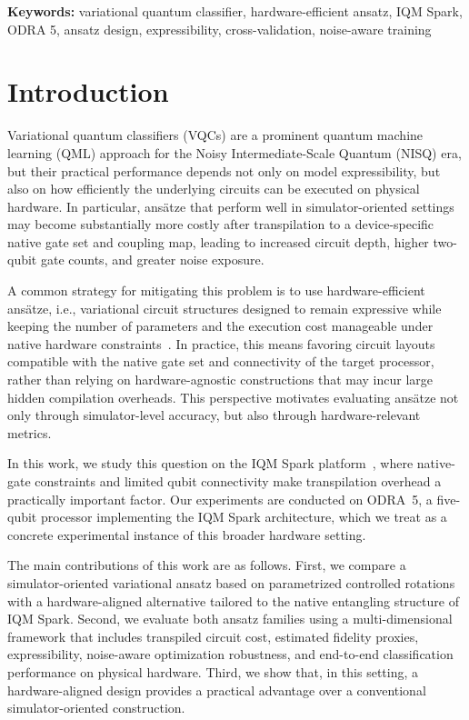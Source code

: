 \documentclass[11pt]{article}
\begin{document}
\noindent\textbf{Keywords:} variational quantum classifier, hardware-efficient ansatz, IQM Spark, ODRA 5, ansatz design, expressibility, cross-validation, noise-aware training

\section{Introduction}

Variational quantum classifiers (VQCs) are a prominent quantum machine learning (QML) approach for the Noisy Intermediate-Scale Quantum (NISQ) era, but their practical performance depends not only on model expressibility, but also on how efficiently the underlying circuits can be executed on physical hardware. In particular, ansätze that perform well in simulator-oriented settings may become substantially more costly after transpilation to a device-specific native gate set and coupling map, leading to increased circuit depth, higher two-qubit gate counts, and greater noise exposure.

A common strategy for mitigating this problem is to use hardware-efficient ansätze, i.e., variational circuit structures designed to remain expressive while keeping the number of parameters and the execution cost manageable under native hardware constraints~\cite{ma2024hea}. In practice, this means favoring circuit layouts compatible with the native gate set and connectivity of the target processor, rather than relying on hardware-agnostic constructions that may incur large hidden compilation overheads. This perspective motivates evaluating ansätze not only through simulator-level accuracy, but also through hardware-relevant metrics.

In this work, we study this question on the IQM Spark platform~\cite{iqmspark}, where native-gate constraints and limited qubit connectivity make transpilation overhead a practically important factor. Our experiments are conducted on ODRA~5, a five-qubit processor implementing the IQM Spark architecture, which we treat as a concrete experimental instance of this broader hardware setting.

The main contributions of this work are as follows. First, we compare a simulator-oriented variational ansatz based on parametrized controlled rotations with a hardware-aligned alternative tailored to the native entangling structure of IQM Spark. Second, we evaluate both ansatz families using a multi-dimensional framework that includes transpiled circuit cost, estimated fidelity proxies, expressibility, noise-aware optimization robustness, and end-to-end classification performance on physical hardware. Third, we show that, in this setting, a hardware-aligned design provides a practical advantage over a conventional simulator-oriented construction.
\end{document}
